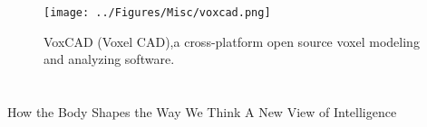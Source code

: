 \begin{figure}
\centering
\texttt{[image: ../Figures/Misc/voxcad.png]}
\caption{VoxCAD (Voxel CAD),a cross-platform open source voxel modeling and analyzing software.}
\label{fig:VoxCAD}
\end{figure}

\section*{}

\cite{stanley2003taxonomy}
\cite{nelson2009fitness}
\cite{meyer1998evolutionary}
How the Body Shapes the Way We Think A New View of Intelligence~\cite{pfeifer2007body}
\cite{albu2008soft}
\cite{woolley2011deleterious}
\cite{lewis1992genetic}
\cite{lapeyre2011maturational}
\cite{oudeyer2013intrinsically}
\cite{gauci:gecco07}
